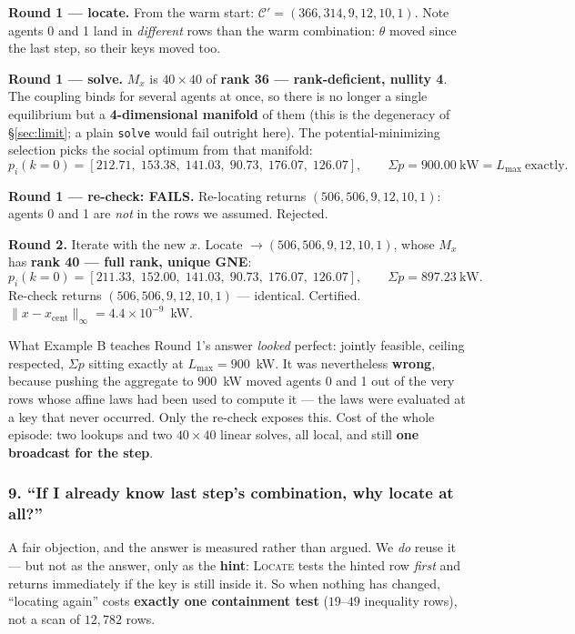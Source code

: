 \documentclass[11pt, letterpaper]{article}
\begin{document}
\textbf{Round 1 --- locate.} From the warm start: $\mathcal C'=(366,314,9,12,10,1)$. Note agents 0
and 1 land in \emph{different} rows than the warm combination: $\theta$ moved since the last step, so
their keys moved too.

\textbf{Round 1 --- solve.} $M_x$ is $40\times40$ of \textbf{rank 36 --- rank-deficient, nullity 4}.
The coupling binds for several agents at once, so there is no longer a single equilibrium but a
\textbf{4-dimensional manifold} of them (this is the degeneracy of \S\ref{sec:limit}; a plain
\texttt{solve} would fail outright here). The potential-minimizing selection picks the social optimum
from that manifold:
\[
  p_i(k{=}0)=[212.71,\;153.38,\;141.03,\;90.73,\;176.07,\;126.07],\qquad
  \Sigma p=\mathbf{900.00}\ \text{kW}=L_{\max}\ \text{exactly}.
\]

\textbf{Round 1 --- re-check: FAILS.} Re-locating returns $(506,506,9,12,10,1)$: agents 0 and 1 are
\emph{not} in the rows we assumed. Rejected.

\textbf{Round 2.} Iterate with the new $x$. Locate $\to(506,506,9,12,10,1)$, whose $M_x$ has
\textbf{rank 40 --- full rank, unique GNE}:
\[
  p_i(k{=}0)=[211.33,\;152.00,\;141.03,\;90.73,\;176.07,\;126.07],\qquad
  \Sigma p=897.23\ \text{kW}.
\]
Re-check returns $(506,506,9,12,10,1)$ --- identical. Certified.
$\lVert x-x_{\mathrm{cent}}\rVert_\infty=4.4\times10^{-9}$~kW.

\begin{keybox}{What Example B teaches}
Round 1's answer \emph{looked} perfect: jointly feasible, ceiling respected, $\Sigma p$ sitting
exactly at $L_{\max}=900$~kW. It was nevertheless \textbf{wrong}, because pushing the aggregate to
$900$~kW moved agents 0 and 1 out of the very rows whose affine laws had been used to compute it ---
the laws were evaluated at a key that never occurred. Only the re-check exposes this. Cost of the
whole episode: two lookups and two $40\times40$ linear solves, all local, and still
\textbf{one broadcast for the step}.
\end{keybox}

\subsubsection*{9. ``If I already know last step's combination, why locate at all?''}
A fair objection, and the answer is measured rather than argued. We \emph{do} reuse it --- but not as
the answer, only as the \textbf{hint}: \textsc{Locate} tests the hinted row \emph{first} and returns
immediately if the key is still inside it. So when nothing has changed, ``locating again'' costs
\textbf{exactly one containment test} ($19$--$49$ inequality rows), not a scan of $12{,}782$ rows.
\end{document}
